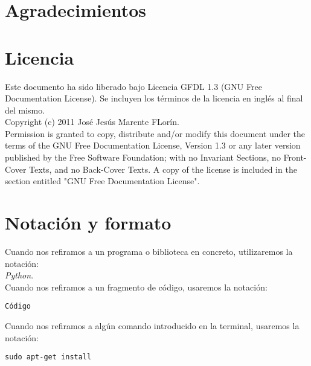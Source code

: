 

\section*{Agradecimientos}


\cleardoublepage

\section*{Licencia} %

Este documento ha sido liberado bajo Licencia GFDL 1.3 (GNU Free
Documentation License). Se incluyen los términos de la licencia en
inglés al final del mismo.\\

Copyright (c) 2011 José Jesús Marente FLorín.\\

Permission is granted to copy, distribute and/or modify this document under the
terms of the GNU Free Documentation License, Version 1.3 or any later version
published by the Free Software Foundation; with no Invariant Sections, no
Front-Cover Texts, and no Back-Cover Texts. A copy of the license is included in
the section entitled "GNU Free Documentation License".\\

\cleardoublepage

\section*{Notación y formato}

Cuando nos refiramos a un programa o biblioteca en concreto, utilizaremos la
notación:\\

\emph{Python}.\\

Cuando nos refiramos a un fragmento de código, usaremos la notación:
\begin{verbatim} 
Código 
\end{verbatim}

Cuando nos refiramos a algún comando introducido en la terminal, usaremos la notación:

\begin{lstlisting}[style=consola, numbers=none]
sudo apt-get install
\end{lstlisting}
